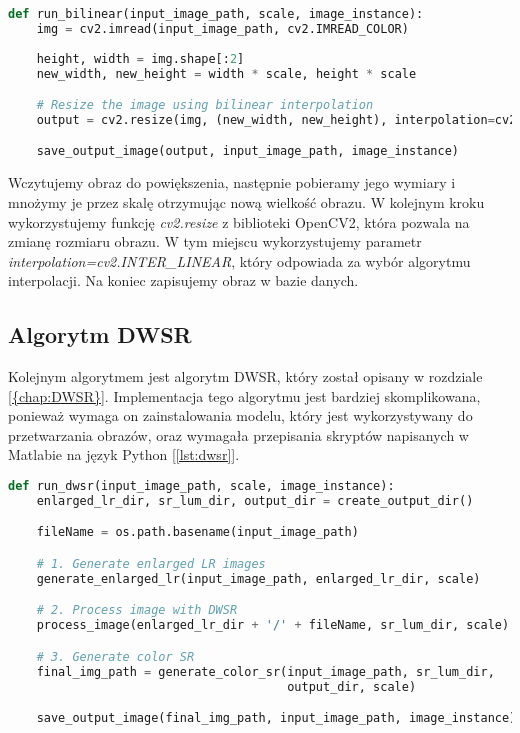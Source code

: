 \begin{lstlisting}[language=Python, caption=Implementacja algorytmu Bilinear., label={lst:bilinear}]
def run_bilinear(input_image_path, scale, image_instance):
    img = cv2.imread(input_image_path, cv2.IMREAD_COLOR)
    
    height, width = img.shape[:2]
    new_width, new_height = width * scale, height * scale

    # Resize the image using bilinear interpolation
    output = cv2.resize(img, (new_width, new_height), interpolation=cv2.INTER_LINEAR)

    save_output_image(output, input_image_path, image_instance)
\end{lstlisting}

Wczytujemy obraz do powiększenia, następnie pobieramy jego wymiary i mnożymy je przez skalę otrzymując nową wielkość obrazu. W kolejnym kroku wykorzystujemy funkcję \textit{cv2.resize} z biblioteki OpenCV2, która pozwala na zmianę rozmiaru obrazu. W tym miejscu wykorzystujemy parametr \textit{interpolation=cv2.INTER\_LINEAR}, który odpowiada za wybór algorytmu interpolacji. Na koniec zapisujemy obraz w bazie danych.


\subsection*{Algorytm DWSR}

Kolejnym algorytmem jest algorytm DWSR, który został opisany w rozdziale \ref{{chap:DWSR}}.
Implementacja tego algorytmu jest bardziej skomplikowana, ponieważ wymaga on zainstalowania modelu, który jest wykorzystywany do przetwarzania obrazów, oraz wymagała przepisania skryptów napisanych w Matlabie na język Python [\ref{lst:dwsr}].


\begin{lstlisting}[language=Python, caption=Implementacja algorytmu DWSR., label={lst:dwsr}]    
def run_dwsr(input_image_path, scale, image_instance):
    enlarged_lr_dir, sr_lum_dir, output_dir = create_output_dir()

    fileName = os.path.basename(input_image_path)

    # 1. Generate enlarged LR images
    generate_enlarged_lr(input_image_path, enlarged_lr_dir, scale) 

    # 2. Process image with DWSR
    process_image(enlarged_lr_dir + '/' + fileName, sr_lum_dir, scale)

    # 3. Generate color SR
    final_img_path = generate_color_sr(input_image_path, sr_lum_dir, 
                                       output_dir, scale) 

    save_output_image(final_img_path, input_image_path, image_instance)
\end{lstlisting}

